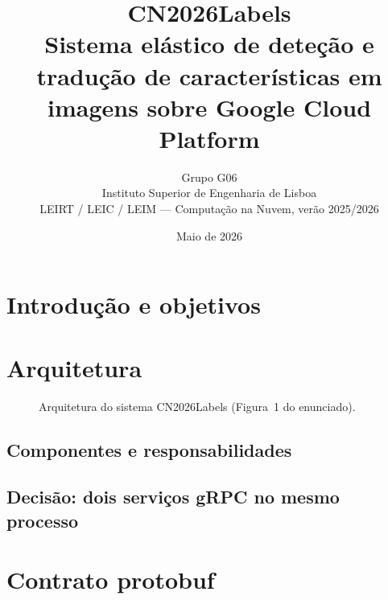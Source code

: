 \documentclass[11pt,a4paper]{article}
\title{\textbf{CN2026Labels} \\[2pt]
       \large Sistema el\'astico de dete\c{c}\~ao e tradu\c{c}\~ao de
       caracter\'isticas em imagens sobre Google Cloud Platform}
\author{Grupo G06 \\
        Instituto Superior de Engenharia de Lisboa \\
        LEIRT / LEIC / LEIM --- Computa\c{c}\~ao na Nuvem, ver\~ao 2025/2026}
\date{Maio de 2026}
\begin{document}
\maketitle

\begin{abstract}
\end{abstract}

\tableofcontents
\vspace{1em}

\section{Introdu\c{c}\~ao e objetivos}
\label{sec:objetivos}

\section{Arquitetura}
\label{sec:arquitetura}
\begin{figure}[h]\centering
\caption{Arquitetura do sistema CN2026Labels (Figura~1 do enunciado).}
\label{fig:arch}
\end{figure}

\subsection{Componentes e responsabilidades}

\subsection{Decis\~ao: dois servi\c{c}os gRPC no mesmo processo}

\section{Contrato protobuf}
\label{sec:contrato}
\end{document}
